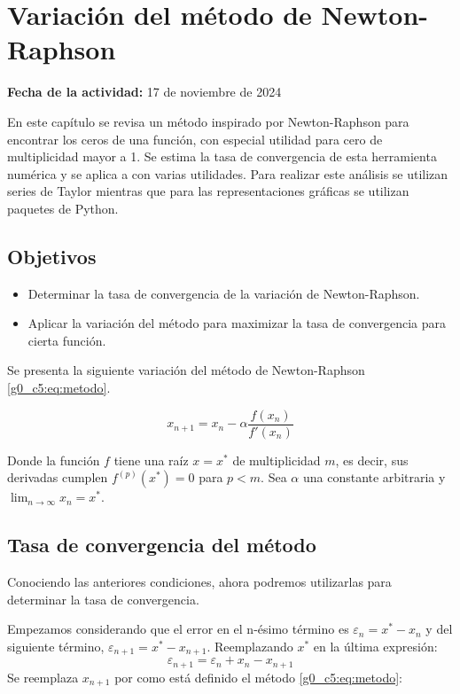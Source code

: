 \documentclass[../portafolio.tex]{subfiles}
\begin{document}
\chapter{Variación del método de Newton-Raphson}
\label{g0_c5}
\hfill \textbf{Fecha de la actividad:} 17 de noviembre de 2024


\medskip


En este capítulo se revisa un método inspirado por Newton-Raphson para encontrar los ceros de una función, con especial utilidad para cero de multiplicidad mayor a 1. Se estima la tasa de convergencia de esta herramienta numérica y se aplica a con varias utilidades. Para realizar este análisis se utilizan series de Taylor mientras que para las representaciones gráficas se utilizan paquetes de Python.


\section*{Objetivos}
\begin{itemize}
\item Determinar la tasa de convergencia de la variación de Newton-Raphson. 
\item Aplicar la variación del método para maximizar la tasa de convergencia para cierta función.
\end{itemize}
Se presenta la siguiente variación del método de Newton-Raphson \eqref{g0_c5:eq:metodo}. 


\begin{equation} \label{g0_c5:eq:metodo}
x_{n+1}=x_n - \alpha \frac{f(x_n)}{f'(x_n)}
\end{equation}


Donde la función $f$ tiene una raíz $x=x^*$ de multiplicidad $m$, es decir, sus derivadas cumplen $f^{(p)}(x^* ) = 0$ para $p<m$. Sea $\alpha$ una constante arbitraria y $\lim_{n\rightarrow \infty} x_n = x^*$. 


\section{Tasa de convergencia del método}


Conociendo las anteriores condiciones, ahora podremos utilizarlas para determinar la tasa de convergencia.


Empezamos considerando que el error en el n-ésimo término es $\varepsilon_n = x^* - x_n$ y del siguiente término, $\varepsilon_{n+1} = x^* -x_{n+1}$. Reemplazando $x^*$ en la última expresión:
\begin{equation}
\varepsilon_{n+1} = \varepsilon_n + x_n - x_{n+1}
\end{equation}
Se reemplaza $x_{n+1}$ por como está definido el método \eqref{g0_c5:eq:metodo}:
\end{document}
